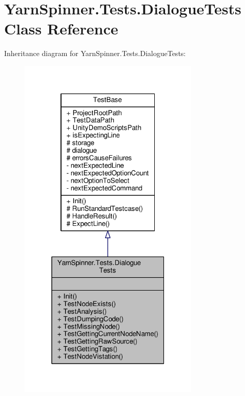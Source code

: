 \hypertarget{a00090}{\section{Yarn\-Spinner.\-Tests.\-Dialogue\-Tests Class Reference}
\label{a00090}
}


Inheritance diagram for Yarn\-Spinner.\-Tests.\-Dialogue\-Tests\-:
\nopagebreak
\begin{figure}[H]
\begin{center}
\leavevmode
\includegraphics[width=244pt]{a00722}
\end{center}
\end{figure}


